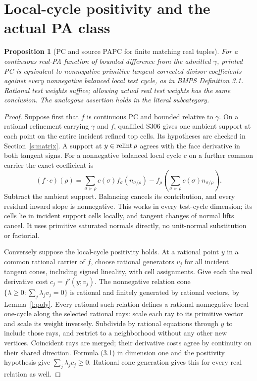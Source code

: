 \documentclass[11pt]{article}
\newtheorem{proposition}[theorem]{Proposition}
\begin{document}
\section{Local-cycle positivity and the actual PA class}\label{s:positivity}
\begin{proposition}[PC and source PAPC for finite matching real tuples]\label{p:papc}
For a continuous real-PA function of bounded difference from the admitted $\gamma$, printed PC is equivalent to nonnegative primitive tangent-corrected divisor coefficients against every nonnegative balanced local test cycle, as in BMPS Definition 3.1. Rational test weights suffice; allowing actual real test weights has the same conclusion. The analogous assertion holds in the literal subcategory.
\end{proposition}
\begin{proof}
Suppose first that $f$ is continuous PC and bounded relative to $\gamma$. On a rational refinement carrying $\gamma$ and $f$, qualified S306 gives one ambient support at each point on the entire incident refined top cells. Its hypotheses are checked in Section~\ref{s:matrix}. A support at $y\in\operatorname{relint}\rho$ agrees with the face derivative in both tangent signs. For a nonnegative balanced local cycle $c$ on a further common carrier the exact coefficient is
\[
 (f\cdot c)(\rho)=\sum_{\sigma\succ\rho}c(\sigma)f_\sigma(n_{\sigma/\rho})
 -f_\rho\!\left(\sum_{\sigma\succ\rho}c(\sigma)n_{\sigma/\rho}\right).
                                                                    \tag{3.1}
\]
Subtract the ambient support. Balancing cancels its contribution, and every residual inward slope is nonnegative. This works in every test-cycle dimension; its cells lie in incident support cells locally, and tangent changes of normal lifts cancel. It uses primitive saturated normals directly, no unit-normal substitution or factorial.

Conversely suppose the local-cycle positivity holds. At a rational point $y$ in a common rational carrier of $f$, choose rational generators $v_j$ for all incident tangent cones, including signed lineality, with cell assignments. Give each the real derivative cost $c_j=f'(y;v_j)$. The nonnegative relation cone $\{\lambda\geq0:\sum_j\lambda_jv_j=0\}$ is rational and finitely generated by rational vectors, by Lemma~\ref{l:poly}. Every rational such relation defines a rational nonnegative local one-cycle along the selected rational rays: scale each ray to its primitive vector and scale its weight inversely. Subdivide by rational equations through $y$ to include those rays, and restrict to a neighborhood without any other new vertices. Coincident rays are merged; their derivative costs agree by continuity on their shared direction. Formula (3.1) in dimension one and the positivity hypothesis give $\sum_j\lambda_j c_j\geq0$. Rational cone generation gives this for every real relation as well.


\end{proof}
\end{document}
